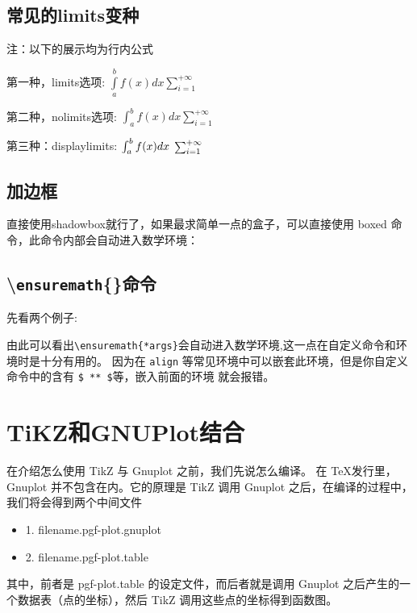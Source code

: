 \documentclass[fontset=windows, 12pt]{article}
\newcommand{\Cmd}[2][\{*args\}]{\texttt{\textbackslash#2#1}}
\begin{document}
\subsection{常见的limits变种}

\textcolor{blue!50}{注：以下的展示均为行内公式}

第一种，limits选项: \ensuremath{\int\limits_{a}^{b}{f(x) dx} }\hspace*{3em}\ensuremath{\sum\limits_{i=1}^{+\infty}}

第二种，nolimits选项: \ensuremath{\int\nolimits_{a}^{b}{f(x) dx} }\hspace*{3em}\ensuremath{\sum\nolimits_{i=1}^{+\infty}}

第三种：displaylimits: \ensuremath{\int\displaylimits_{a}^{b}{f(x) dx}} \hspace*{3em}\ensuremath{\sum\displaylimits_{i=1}^{+\infty}}


\subsection{加边框}
直接使用shadowbox就行了，如果最求简单一点的盒子，可以直接使用 boxed 命令，此命令内部会自动进入数学环境：

 \hfill
{}


\subsection{\textbackslash \texttt{ensuremath}\{\}命令}
先看两个例子:\\
\hfill
{}

\vspace*{2em}
由此可以看出\Cmd{ensuremath}会自动进入数学环境,这一点在自定义命令和环境时是十分有用的。
因为在 \verb |align| 等常见环境中可以嵌套此环境，但是你自定义命令中的含有 \verb |$ ** $|等，嵌入前面的环境
就会报错。



\section{TiKZ和GNUPlot结合}
在介绍怎么使用 TikZ 与 Gnuplot 之前，我们先说怎么编译。
在 \TeX 发行里，Gnuplot 并不包含在内。它的原理是 TikZ 调用
Gnuplot 之后，在编译的过程中，我们将会得到两个中间文件
\begin{itemize}
    \item 1. filename.pgf-plot.gnuplot
    \item 2. filename.pgf-plot.table
\end{itemize}
其中，前者是 pgf-plot.table 的设定文件，而后者就是调用 Gnuplot 
之后产生的一个数据表（点的坐标），然后 TikZ 调用这些点的坐标得到函数图。
\end{document}
